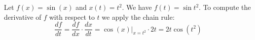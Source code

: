 \begin{example}
    Let $f(x) = \sin{(x)}$ and $x(t) = t^2$. We have $f(t) = \sin{t^2}$. To compute the derivative of $f$ with respect to $t$ we apply the chain rule:
    $$ \frac{df}{dt} = \frac{df}{dx} \cdot \frac{dx}{dt} = \left.\cos{(x)}\right|_{x = t^2} \cdot 2t = 2t\cos{(t^2)} $$
\end{example}